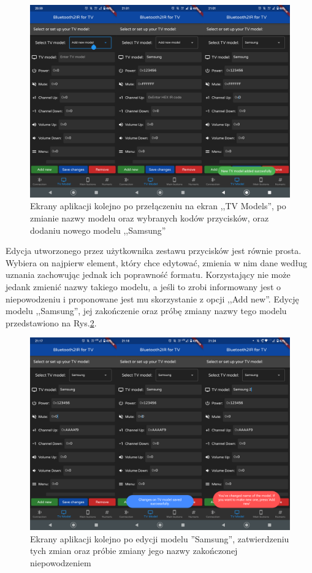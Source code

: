 \documentclass[12pt,twoside,draft]{article}
\begin{document}
\begin{figure}[ht]
   \centering
   \includegraphics[width=14cm]{images/addingSamsung.png}
   \caption{Ekrany aplikacji kolejno po przełączeniu na ekran ,,TV Models'', po zmianie nazwy modelu oraz wybranych kodów przycisków, oraz dodaniu nowego modelu ,,Samsung''}
   \label{Fig:addingSamsung}
\end{figure}

Edycja utworzonego przez użytkownika zestawu przycisków jest równie prosta. Wybiera on najpierw element, który chce edytować, zmienia w nim dane według uznania zachowując jednak ich poprawność formatu. Korzystający nie może jedank zmienić nazwy takiego modelu, a jeśli to zrobi informowany jest o niepowodzeniu i proponowane jest mu skorzystanie z opcji ,,Add new''. Edycję modelu ,,Samsung'', jej zakończenie oraz  próbę zmiany nazwy tego modelu przedstawiono na Rys.\ref*{Fig:changingSamsung}.

\begin{figure}[ht]
   \centering
   \includegraphics[width=14cm]{images/changingSamsung.png}
   \caption{Ekrany aplikacji kolejno po edycji modelu ''Samsung'', zatwierdzeniu tych zmian oraz próbie zmiany jego nazwy zakończonej niepowodzeniem}
   \label{Fig:changingSamsung}
\end{figure}
\end{document}
